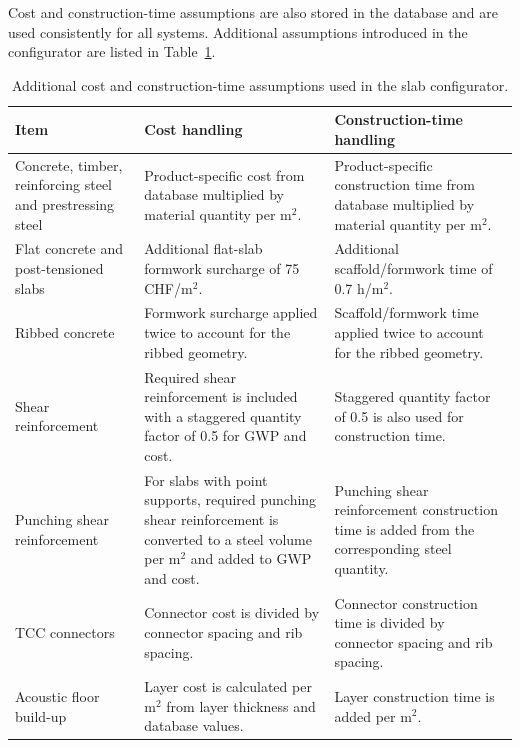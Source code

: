\noindent Cost and construction-time assumptions are also stored in the database and are used consistently for all systems. Additional assumptions introduced in the configurator are listed in Table~\ref{tab:cost_time_assumptions}.

\begin{table}[htbp]
    \centering
    \begingroup
    \scriptsize
    \setlength{\tabcolsep}{3pt}
    \renewcommand{\arraystretch}{1.15}
    \begin{tabularx}{\textwidth}{@{}l|X|X@{}}
    \hline
    \textbf{Item} & \textbf{Cost handling} & \textbf{Construction-time handling} \\ \hline
    Concrete, timber, reinforcing steel and prestressing steel &
    Product-specific cost from database multiplied by material quantity per m$^2$. &
    Product-specific construction time from database multiplied by material quantity per m$^2$. \\
    Flat concrete and post-tensioned slabs &
    Additional flat-slab formwork surcharge of 75 CHF/m$^2$. &
    Additional scaffold/formwork time of 0.7 h/m$^2$. \\
    Ribbed concrete &
    Formwork surcharge applied twice to account for the ribbed geometry. &
    Scaffold/formwork time applied twice to account for the ribbed geometry. \\
    Shear reinforcement &
    Required shear reinforcement is included with a staggered quantity factor of 0.5 for GWP and cost. &
    Staggered quantity factor of 0.5 is also used for construction time. \\
    Punching shear reinforcement &
    For slabs with point supports, required punching shear reinforcement is converted to a steel volume per m$^2$ and added to GWP and cost. &
    Punching shear reinforcement construction time is added from the corresponding steel quantity. \\
    TCC connectors &
    Connector cost is divided by connector spacing and rib spacing. &
    Connector construction time is divided by connector spacing and rib spacing. \\
    Acoustic floor build-up &
    Layer cost is calculated per m$^2$ from layer thickness and database values. &
    Layer construction time is added per m$^2$. \\ \hline
    \end{tabularx}
    \endgroup
    \caption{Additional cost and construction-time assumptions used in the slab configurator.}
    \label{tab:cost_time_assumptions}
\end{table}


